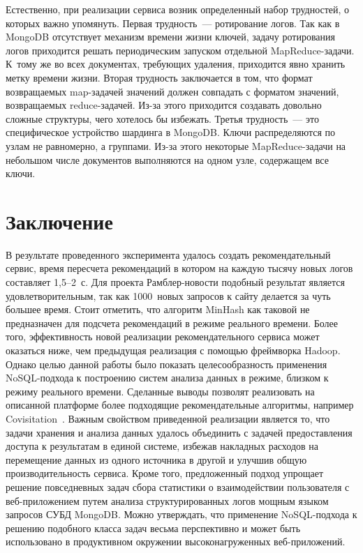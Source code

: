 \begin{multicols}{2}
   Естественно, при реализации сервиса возник определенный набор 
трудностей, о которых важно упомянуть. Первая трудность~--- ротирование 
логов. Так как в MongoDB отсутствует механизм времени жизни ключей, 
задачу ротирования логов приходится решать периодическим запуском 
отдельной MapReduce-за\-да\-чи. К~тому же во всех документах, тре\-бу\-ющих 
удаления, приходится явно хранить метку времени жизни. Вторая труд\-ность 
заключается в том, что формат возвращаемых map-задачей значений должен 
совпадать с форматом значений, возвращаемых reduce-за\-да\-чей. Из-за этого 
приходится создавать довольно сложные структуры, чего хотелось бы 
избежать. Третья труд\-ность~--- это специфическое устройство шардинга в 
MongoDB. Ключи распределяются по узлам не равномерно, а группами. Из-за 
этого некоторые MapReduce-за\-да\-чи на небольшом числе документов 
выполняются на одном узле, содержащем все ключи.

\section{Заключение}

   В результате проведенного эксперимента удалось создать рекомендательный 
сервис, время пересчета рекомендаций в котором на каждую тысячу новых 
логов составляет 1,5--2~с. Для проекта Рамб\-лер-но\-вос\-ти подобный 
результат является удовлетворительным, так как 1000~новых запросов к сайту 
делается за чуть большее время. Стоит отметить, что алгоритм MinHash как 
таковой не предназначен для подсчета рекомендаций в режиме реального 
времени. Более того, эффективность новой реализации рекомендательного 
сервиса может оказаться ниже, чем предыдущая реализация с по\-мощью 
фреймворка Hadoop. Однако целью данной работы было показать 
целесообразность применения NoSQL-под\-хо\-да к построению сис\-тем 
анализа данных в режиме, близком к режиму реального времени. Сделанные 
выводы позволят реализовать на описанной платформе более подходящие 
рекомендательные алгоритмы, например Covisitation~\cite{5-kli}. Важным 
свойством приведенной реализации является то, что задачи хранения и анализа 
данных удалось объединить с задачей предоставления доступа к результатам в 
единой системе, избежав накладных расходов на перемещение данных из 
одного источника в другой и улучшив общую производительность сервиса. 
Кроме того, предложенный подход упрощает решение повседневных задач 
сбора статистики о взаимодействии пользователя с веб-при\-ло\-же\-ни\-ем 
путем анализа структурированных логов мощным языком запросов СУБД 
MongoDB. Можно утверждать, что применение NoSQL-под\-хо\-да к решению 
подобного класса задач весьма перспективно и может быть использовано в 
продуктивном окружении высоконагруженных веб-при\-ло\-жений.


\end{multicols}
